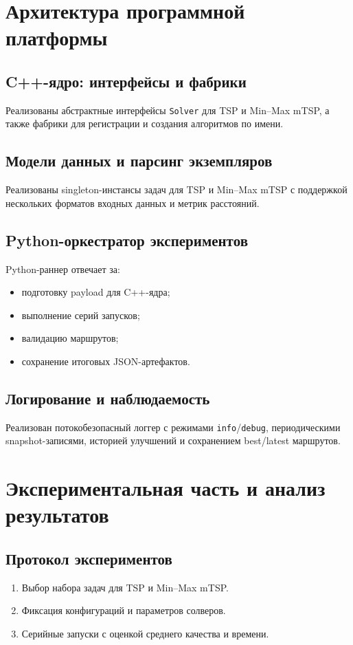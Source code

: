 \documentclass[a4paper,12pt]{extarticle}
\begin{document}
\pagebreak

\section{Архитектура программной платформы}

\subsection{C++-ядро: интерфейсы и фабрики}
Реализованы абстрактные интерфейсы \texttt{Solver} для TSP и Min--Max mTSP, а также фабрики для регистрации и создания алгоритмов по имени.

\subsection{Модели данных и парсинг экземпляров}
Реализованы singleton-инстансы задач для TSP и Min--Max mTSP с поддержкой нескольких форматов входных данных и метрик расстояний.

\subsection{Python-оркестратор экспериментов}
Python-раннер отвечает за:
\begin{itemize}
    \item подготовку payload для C++-ядра;
    \item выполнение серий запусков;
    \item валидацию маршрутов;
    \item сохранение итоговых JSON-артефактов.
\end{itemize}

\subsection{Логирование и наблюдаемость}
Реализован потокобезопасный логгер с режимами \texttt{info}/\texttt{debug}, периодическими snapshot-записями, историей улучшений и сохранением best/latest маршрутов.

\pagebreak

\section{Экспериментальная часть и анализ результатов}

\subsection{Протокол экспериментов}
\begin{enumerate}
    \item Выбор набора задач для TSP и Min--Max mTSP.
    \item Фиксация конфигураций и параметров солверов.
    \item Серийные запуски с оценкой среднего качества и времени.
\end{enumerate}
\end{document}
